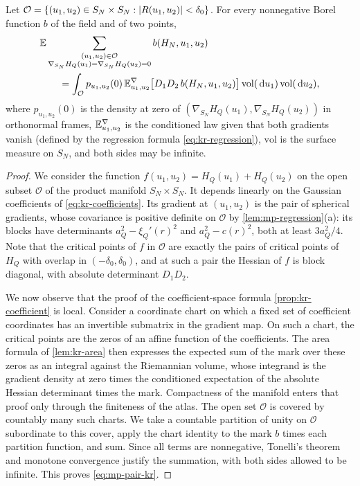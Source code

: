 \begin{lemma}\label{lem:mp-pair-kr}
Let $\mathcal O=\{(u_1,u_2)\in S_N\times S_N:\left|R(u_1,u_2)\right|<\delta_0\}$. For every nonnegative Borel function $b$ of the field and of two points,
\begin{equation}\label{eq:mp-pair-kr}
\begin{aligned}
&\mathbb E\sum_{\substack{(u_1,u_2)\in\mathcal O\\ \nabla_{S_N}H_Q(u_1)=\nabla_{S_N}H_Q(u_2)=0}}b(H_N,u_1,u_2)\\
&\qquad=\int_{\mathcal O}p_{u_1,u_2}(0)\,\mathbb E^\nabla_{u_1,u_2}\bigl[D_1D_2\,b(H_N,u_1,u_2)\bigr]\,\mathrm{vol}(\,\mathrm d u_1)\,\mathrm{vol}(\,\mathrm d u_2),
\end{aligned}
\end{equation}
where $p_{u_1,u_2}(0)$ is the density at zero of $(\nabla_{S_N}H_Q(u_1),\nabla_{S_N}H_Q(u_2))$ in orthonormal frames, $\mathbb E^\nabla_{u_1,u_2}$ is the conditioned law given that both gradients vanish (defined by the regression formula \eqref{eq:kr-regression}), $\mathrm{vol}$ is the surface measure on $S_N$, and both sides may be infinite.
\end{lemma}

\begin{proof}
We consider the function $f(u_1,u_2)=H_Q(u_1)+H_Q(u_2)$ on the open subset $\mathcal O$ of the product manifold $S_N\times S_N$. It depends linearly on the Gaussian coefficients of \eqref{eq:kr-coefficients}. Its gradient at $(u_1,u_2)$ is the pair of spherical gradients, whose covariance is positive definite on $\mathcal O$ by \cref{lem:mp-regression}(a): its blocks have determinants $a_Q^2-\xi_Q'(r)^2$ and $a_Q^2-c(r)^2$, both at least $3a_Q^2/4$. Note that the critical points of $f$ in $\mathcal O$ are exactly the pairs of critical points of $H_Q$ with overlap in $(-\delta_0,\delta_0)$, and at such a pair the Hessian of $f$ is block diagonal, with absolute determinant $D_1D_2$.

We now observe that the proof of the coefficient-space formula \cref{prop:kr-coefficient} is local. Consider a coordinate chart on which a fixed set of coefficient coordinates has an invertible submatrix in the gradient map. On such a chart, the critical points are the zeros of an affine function of the coefficients. The area formula of \cref{lem:kr-area} then expresses the expected sum of the mark over these zeros as an integral against the Riemannian volume, whose integrand is the gradient density at zero times the conditioned expectation of the absolute Hessian determinant times the mark. Compactness of the manifold enters that proof only through the finiteness of the atlas. The open set $\mathcal O$ is covered by countably many such charts. We take a countable partition of unity on $\mathcal O$ subordinate to this cover, apply the chart identity to the mark $b$ times each partition function, and sum. Since all terms are nonnegative, Tonelli's theorem and monotone convergence justify the summation, with both sides allowed to be infinite. This proves \eqref{eq:mp-pair-kr}.
\end{proof}

